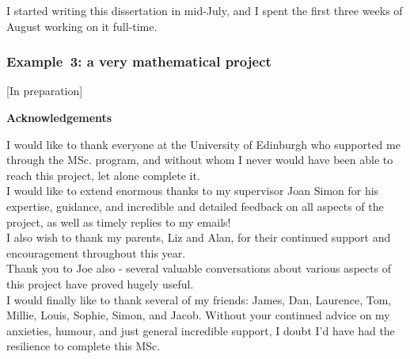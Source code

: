 \documentclass[12pt,a4paper]{report}
\numberwithin{equation}{section}
\theoremstyle{definition}
\theoremstyle{theorem}
\theoremstyle{theorem}
\theoremstyle{example}
\theoremstyle{definition}
\begin{document}
I started writing this dissertation in mid-July, and I spent the first
three weeks of August working on it full-time.



\subsubsection{Example~3: a very mathematical project}

[In preparation]



\newpage

\begin{center}
\textbf{Acknowledgements}
\end{center}

I would like to thank everyone at the University of Edinburgh who supported me through the MSc. program, and without whom I never would have been able to reach this project, let alone complete it.\\
I would like to extend enormous thanks to my supervisor Joan Simon for his expertise, guidance, and incredible and detailed feedback on all aspects of the project, as well as timely replies to my emails!\\
I also wish to thank my parents, Liz and Alan, for their continued support and encouragement throughout this year.\\
Thank you to Joe also - several valuable conversations about various aspects of this project have proved hugely useful.\\
I would finally like to thank several of my friends: James, Dan, Laurence, Tom, Millie, Louis, Sophie, Simon, and Jacob. Without your continued advice on my anxieties, humour, and just general incredible support, I doubt I'd have had the resilience to complete this MSc. 

\tableofcontents
\listoftables
\listoffigures

\end{document}
